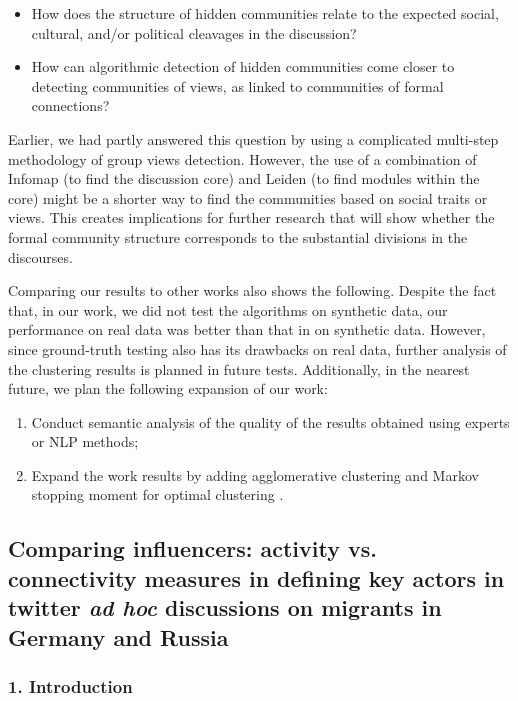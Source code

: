 \begin{itemize}
	\item How does the structure of hidden communities relate to the expected social, cultural, and/or political cleavages in the discussion?
	\item How can algorithmic detection of hidden communities come closer to detecting communities of views, as linked to communities of formal connections?	
\end{itemize}

Earlier, we had partly answered this question \cite{BodrunovaBlekanov} by using a complicated multi-step methodology of group views detection. However, the use of a combination of Infomap (to find the discussion core) and Leiden (to find modules within the core) might be a shorter way to find the communities based on social traits or views. This creates implications for further research that will show whether the formal community structure corresponds to the substantial divisions in the discourses.

Comparing our results to other works also shows the following. Despite the fact that, in our work, we did not test the algorithms on synthetic data, our performance on real data was better than that in \cite{VanLierdeDelvenneVanDooren} on synthetic data. However, since ground-truth testing also has its drawbacks on real data, further analysis of the clustering results is planned in future tests. Additionally, in the nearest future, we plan the following expansion of our work:

\begin{enumerate}
	\item Conduct semantic analysis of the quality of the results obtained using experts or NLP methods;
	\item Expand the work results by adding agglomerative clustering and Markov stopping moment for optimal clustering \cite{BodrunovaOrekhovBlekanov}.
\end{enumerate}

\subsection{Comparing influencers: activity vs. connectivity measures in defining key actors in twitter \textit{ad hoc} discussions on migrants in Germany and Russia}\label{subsec:ch2/sec4/sub3}

\subsubsection{1. Introduction}

